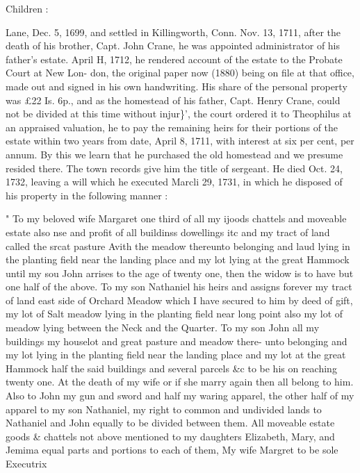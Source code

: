 \documentclass[oneside]{book}
\begin{document}
Children : 










Lane, Dec. 5, 1699, and settled in Killingworth, Conn. Nov. 13, 
1711, after the death of his brother, Capt. John Crane, he was 
appointed administrator of his father's estate. April H, 1712, he 
rendered account of the estate to the Probate Court at New Lon- 
don, the original paper now (1880) being on file at that office, 
made out and signed in his own handwriting. His share of the 
personal property was £22  Is.  6p., and as the homestead of 
his father, Capt. Henry Crane, could not be divided at this time 
without injur\}', the court ordered it to Theophilus at an appraised 
valuation, he to pay the remaining heirs for their portions of the 
estate within two years from date, April 8, 1711, with interest at 
six per cent, per annum. By this we learn that he purchased the 
old homestead and we presume resided there. The town records 
give him the title of sergeant. He died Oct. 24, 1732, leaving a 
will which he executed Marcli 29, 1731, in which he disposed of 
his property in the following manner : 

" To my beloved wife Margaret one third of all my ijoods chattels and 
moveable estate also nse and profit of all buildinss dowellings itc and 
my tract of land called the srcat pasture Avith the meadow thereunto 
belonging and laud lying in the planting field near the landing place and 
my lot lying at the great Hammock until my sou John arrises to the age 
of twenty one, then the widow is to have but one half of the above. 
To my son Nathaniel his heirs and assigns forever my tract of land east 
side of Orchard Meadow which I have secured to him by deed of gift, 
my lot of Salt meadow lying in the planting field near long point also my 
lot of meadow lying between the Neck and the Quarter. To my son 
John all my buildings my houselot and great pasture and meadow there- 
unto belonging and my lot lying in the planting field near the landing 
place and my lot at the great Hammock half the said buildings and 
several parcels \&c to be his on reaching twenty one. At the death of my 
wife or if she marry again then all belong to him. Also to John my gun 
and sword and half my waring apparel, the other half of my apparel to 
my son Nathaniel, my right to common and undivided lands to Nathaniel 
and John equally to be divided between them. All moveable estate 
goods \& chattels not above mentioned to my daughters Elizabeth, Mary, 
and Jemima equal parts and portions to each of them, 
My wife Margret to be sole Executrix 
\end{document}

